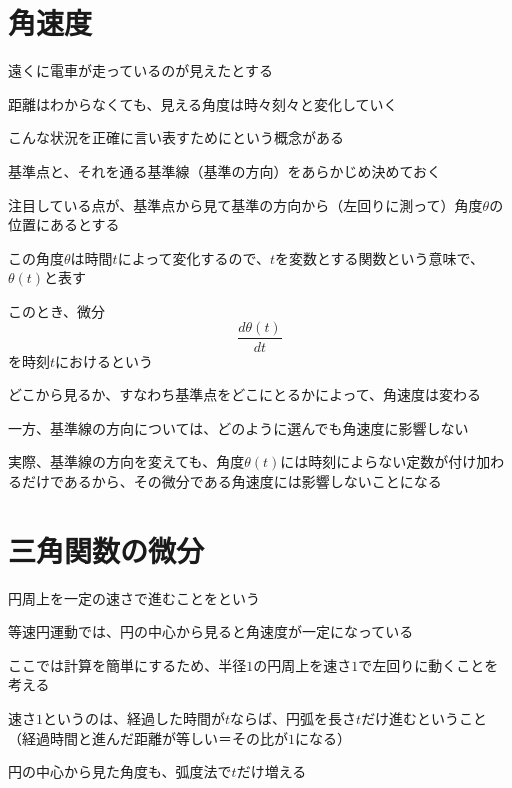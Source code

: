 \documentclass[../book_jiriki_calc]{subfiles}
\begin{document}
\section{角速度}

遠くに電車が走っているのが見えたとする

距離はわからなくても、見える角度は時々刻々と変化していく

こんな状況を正確に言い表すためにという概念がある

\sectionline

基準点と、それを通る基準線（基準の方向）をあらかじめ決めておく

注目している点が、基準点から見て基準の方向から（左回りに測って）角度$\theta$の位置にあるとする

\br

この角度$\theta$は時間$t$によって変化するので、$t$を変数とする関数という意味で、$\theta (t)$と表す

このとき、微分
\begin{equation}
  \dfrac{d\theta(t)}{dt}
\end{equation}
を時刻$t$におけるという

\sectionline

どこから見るか、すなわち基準点をどこにとるかによって、角速度は変わる

一方、基準線の方向については、どのように選んでも角速度に影響しない

\br

実際、基準線の方向を変えても、角度$\theta(t)$には時刻によらない定数が付け加わるだけであるから、その微分である角速度には影響しないことになる

\section{三角関数の微分}

円周上を一定の速さで進むことをという

等速円運動では、円の中心から見ると角速度が一定になっている

\sectionline

ここでは計算を簡単にするため、半径$1$の円周上を速さ$1$で左回りに動くことを考える

速さ$1$というのは、経過した時間が$t$ならば、円弧を長さ$t$だけ進むということ（経過時間と進んだ距離が等しい＝その比が$1$になる）

円の中心から見た角度も、弧度法で$t$だけ増える

\br
\end{document}
